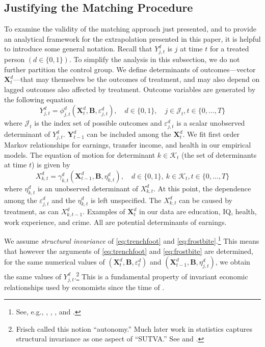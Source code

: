 \subsection{Justifying the Matching Procedure}

To examine the validity of the matching approach just presented, and to provide an analytical framework for the extrapolation presented in this paper, it is helpful to introduce some general notation. Recall that $Y^d_{j,t}$ is $j$ at time $t$ for a treated person $(d\in\{0,1\})$. To simplify the analysis in this subsection, we do not further partition the control group. We define determinants of outcomes---vector $\bm{X}^d_t$---that may themselves be the outcomes of treatment, and may also depend on lagged outcomes also affected by treatment. Outcome variables are generated by the following equation
\begin{equation}\label{eq:trenchfoot}
Y^d_{j,t} = \phi^d_{j,t} (\bm{X}^d_t, \bm{B}, \varepsilon^d_{j,t}), \quad d \in \{0,1\}, \quad j \in \mathcal{J}_t, t \in \{0,\dots,T\}
\end{equation}
where $\mathcal{J}_t$ is the index set of possible outcomes and $\varepsilon^d_{j,t}$ is a scalar unobserved determinant of $Y^d_{j,t}$. $\bm{Y}^d_{t-1}$ can be included among the $\bm{X}^d_{t}$. We fit first order Markov relationships for earnings, transfer income, and health in our empirical models. The equation of motion for determinant $k \in \mathcal{K}_t$ (the set of determinants at time $t$) is given by
\begin{equation}\label{eq:frostbite}
X^d_{k,t} = \gamma^d_{k,t} (\bm{X}^d_{t-1}, \bm{B}, \eta^d_{k,t}), \quad d \in \{0,1\}, \ k \in \mathcal{K}_t, t \in \{0,\dots,T\}
\end{equation}
where $\eta^d_{k,t}$ is an unobserved determinant of $X^d_{k,t}$. At this point, the dependence among the $\varepsilon^d_{j,t}$ and the $\eta^d_{k,t}$ is left unspecified. The $X^d_{k,t}$ can be caused by treatment, as can $X^d_{k,t-1}$. Examples of $\bm{X}^d_t$ in our data are education, IQ, health, work experience, and crime. All are potential determinants of earnings.

We assume \emph{structural invariance} of \eqref{eq:trenchfoot} and \eqref{eq:frostbite}.\footnote{See, e.g., \citet{Frisch_1938_autonomy}, \citet{Haavelmo_1943_Econometrica,Haavelmo_1944_Econometrica}, \citet{Hurwicz_1962_structural}, and \citet{Heckman_Pinto_2015_EconometTheory}.} This means that however the arguments of \eqref{eq:trenchfoot} and \eqref{eq:frostbite} are determined, for the same numerical values of $(\bm{X}^d_t, \bm{B}, \varepsilon^d_t)$ and $(\bm{X}^d_{t-1}, \bm{B}, \eta^d_{j,t})$, we obtain the same values of $Y^d_{j,t}$.\footnote{Frisch called this notion ``autonomy.'' Much later work in statistics captures structural invariance as one aspect of ``SUTVA.'' See \citet{Holland_1986_JASA} and \citet{Heckman_2008_ISR}.} This is a fundamental property of invariant economic relationships used by economists since the time of \citet{Frisch_1938_autonomy}.

